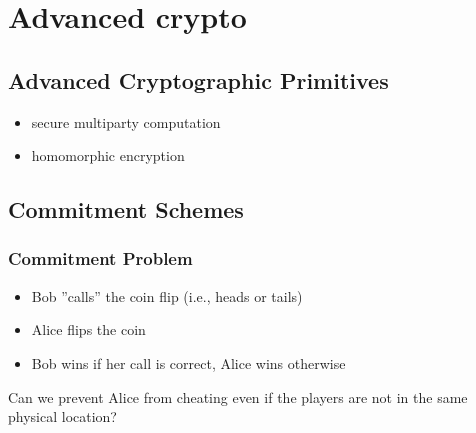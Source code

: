 \documentclass[final]{article}
\begin{document}

\section{Advanced crypto}
\subsection{Advanced Cryptographic Primitives}
\begin{itemize}[nosep]
    \item secure multiparty computation
    \item homomorphic encryption
\end{itemize}
\subsection{Commitment Schemes}
\subsubsection*{Commitment Problem}
\begin{itemize}[nosep]
    \item Bob ''calls'' the coin flip (i.e., heads or tails)
    \item Alice flips the coin
    \item Bob wins if her call is correct, Alice wins otherwise
\end{itemize}
Can we prevent Alice from cheating even if the players are not in the same physical location?
\end{document}
